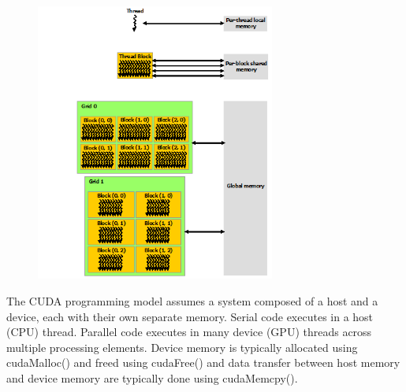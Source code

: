  \begin{figure}[H]
    \centering
        \includegraphics[totalheight=0.5\textheight,width=0.7\textwidth]{grids.png}
    \caption{}
    \label{fig:warp_scheduler}
\end{figure}

The CUDA programming model assumes a system composed of a host and a device, each with their own separate memory. Serial code executes in a host (CPU) thread. Parallel code executes in many device (GPU) threads across multiple processing elements. Device memory is typically allocated using cudaMalloc() and freed using cudaFree() and data transfer between host memory and device memory are typically done using cudaMemcpy(). 

